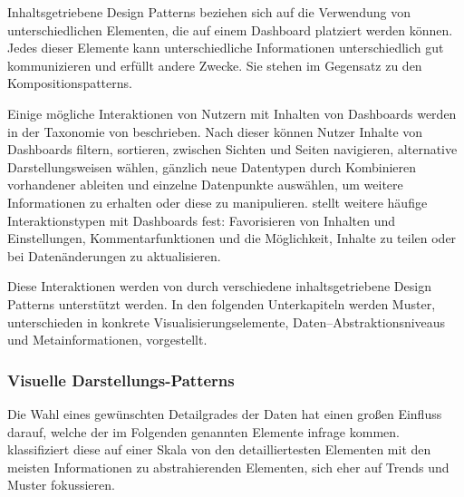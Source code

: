 Inhaltsgetriebene Design Patterns beziehen sich auf die Verwendung von unterschiedlichen Elementen, die auf einem Dashboard platziert werden können.
Jedes dieser Elemente kann unterschiedliche Informationen unterschiedlich gut kommunizieren und erfüllt andere Zwecke.
Sie stehen im Gegensatz zu den Kompositionspatterns.

Einige mögliche Interaktionen von Nutzern mit Inhalten von Dashboards werden in der Taxonomie von \autocite[S. 1]{Heer.InteractiveDynamicsVisualAnalysis.2012} beschrieben.
Nach dieser können Nutzer Inhalte von Dashboards filtern, sortieren, zwischen Sichten und Seiten navigieren, alternative Darstellungsweisen wählen, gänzlich neue Datentypen durch Kombinieren vorhandener ableiten und einzelne Datenpunkte auswählen, um weitere Informationen zu erhalten oder diese zu manipulieren.
\autocite[S. 25]{MarcusHomannVassilenaBanovaPaulOelbermannHolgerWittgesandHelmutKrcmar.TowardsUserInterfaceComponentsforDashboardApplicationsonSmartphones.2013} stellt weitere häufige Interaktionstypen mit Dashboards fest:
Favorisieren von Inhalten und Einstellungen, Kommentarfunktionen und die Möglichkeit, Inhalte zu teilen oder bei Datenänderungen zu aktualisieren.

Diese Interaktionen werden von durch verschiedene inhaltsgetriebene Design Patterns unterstützt werden.
In den folgenden Unterkapiteln werden Muster, unterschieden in konkrete Visualisierungselemente, Daten--Abstraktionsniveaus und Metainformationen, vorgestellt.

\subsubsection{Visuelle Darstellungs-Patterns}

Die Wahl eines gewünschten Detailgrades der Daten hat einen großen Einfluss darauf, welche der im Folgenden genannten Elemente infrage kommen.
\autocite[S. 3]{Bach.DashboardDesignPatterns.2023} klassifiziert diese auf einer Skala von den detailliertesten Elementen mit den meisten Informationen zu abstrahierenden Elementen, sich eher auf Trends und Muster fokussieren.

